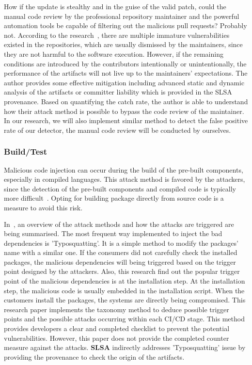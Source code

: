 How if the update is stealthy and in the guise of the valid patch, could the manual code review by the 
professional repository maintainer and the powerful automation tools be capable of filtering out the 
malicious pull requests? Probably not. According to the research~\cite{wu2021feasibility},
there are multiple immature vulnerabilities existed in the repositories, which are usually dismissed by the maintainers, 
since they are not harmful to the software execution. However, if the remaining conditions are introduced by
the contributors intentionally or unintentionally, the performance of the artifacts will not live up to the 
maintainers' expectations. 
The author provides some effective mitigation including advanced static and dynamic analysis of the artifacts or
committer liability which is provided in the SLSA provenance. Based on quantifying the catch rate, the author is
able to understand how their attack method is possible to bypass the code review of the maintainer. In our research, 
we will also implement similar method to detect the false positive rate of our detector, the manual code review will
be conducted by ourselves.  

\subsubsection{Build/Test}
Malicious code injection can occur during the build of the pre-built components, especially in compiled languages.
This attack method is favored by the attackers, since the detection of the pre-built components and compiled code is 
typically more difficult~\cite{ladisa2023journey}. Opting for building package directly from 
source code is a measure to avoid this risk.

In~\cite{ohm2020backstabber}, 
an overview of the attack methods and how the attacks are triggered are being summarised. 
The most frequent way implemented to inject the bad dependencies is 'Typosquatting'. It is a simple method
to modify the packages' name with a similar one. If the consumers did not carefully check the installed 
packages, the malicious dependencies will being triggered based on the trigger point designed by the 
attackers. 
Also, this research find out the popular trigger point of the malicious dependencies is at the
installation step. At the installation step, the malicious code is usually embedded in the installation
script. When the customers install the packages, the systems are directly being compromised.  
This research paper implements the taxonomy method to deduce possible trigger points and 
the possible attacks occurring within each CI/CD stage. This method provides developers a clear 
and completed checklist to prevent the potential vulnerabilities. However, this paper does not
provide the completed counter measure against the attacks.
\textbf{SLSA} indirectly addresses 'Typosquatting' issue by providing the provenance to check the origin of
the artifacts. 

